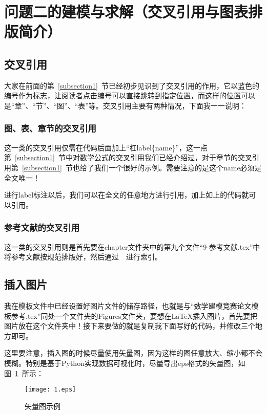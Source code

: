 \section{问题二的建模与求解（交叉引用与图表排版简介）}

\subsection{交叉引用}

大家在前面的第~\ref{subsection1}~节已经初步见识到了交叉引用的作用，它以蓝色的编号作为标志，让阅读者点击编号可以直接跳转到指定位置，而这样的位置可以是“章”、“节”、“图”、“表”等。交叉引用主要有两种情况，下面我一一说明：

\subsubsection{图、表、章节的交叉引用}

这一类的交叉引用仅需在代码后面加上“杠label\{name\}”，这一点第~\ref{subsection1}~节中对数学公式的交叉引用我们已经介绍过，对于章节的交叉引用第~\ref{subsection1}~节也给了我们一个很好的示例。需要注意的是这个name必须是全文唯一！

进行label标注以后，我们可以在全文的任意地方进行引用，加上如上的代码就可以引用。

\subsubsection{参考文献的交叉引用}

这一类的交叉引用则是首先要在chapter文件夹中的第九个文件“9-参考文献.tex”中将参考文献按规范排版好，然后通过~\cite{ref1}~进行索引。






\subsection{插入图片}

我在模板文件中已经设置好图片文件的储存路径，也就是与“数学建模竞赛论文模板参考.tex”同处一个文件夹的Figures文件夹，要想在\LaTeX 插入图片，首先要把图片放在这个文件夹中！接下来要做的就是复制我下面写好的代码，并修改三个地方即可。

这里要注意，插入图的时候尽量使用矢量图，因为这样的图任意放大、缩小都不会模糊。特别是基于Python实现数据可视化时，尽量导出eps格式的矢量图，如图~\ref{fig2}~所示：

\begin{figure}[H] 
	\centering 
	\texttt{[image: 1.eps]}
	\caption{矢量图示例} 
	\label{fig2}
\end{figure}


